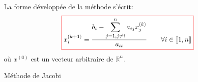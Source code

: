 \documentclass{beamer}
\newcommand{\myredbox}[1]{\fcolorbox{red}{white}{$\displaystyle#1$}}
\newenvironment{algo}{
\begin{algorithm}[H]
\DontPrintSemicolon \SetAlgoVlined}
{\end{algorithm}}
\begin{document}
\begin{frame}

La forme développée de la méthode s'écrit:
\[
\myredbox{x_i^{(k+1)}=\frac{\displaystyle b_i-\sum_{\substack{j=1, j\neq i}}^n a_{ij}x_j^{(k)}}{a_{ii}} \qquad \forall i \in \llbracket 1, n \rrbracket}
\]
où $x^{(0)}$ est un vecteur arbitraire de $\mathbb{R}^n$.

\begin{algo}
\caption{Méthode de Jacobi}
\end{algo}

\end{frame}
\end{document}
